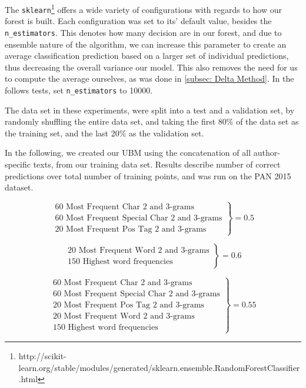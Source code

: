 The \texttt{sklearn}\footnote{http://scikit-learn.org/stable/modules/generated/sklearn.ensemble.RandomForestClassifier.html} offers a wide variety of configurations with regards to how our forest is built. Each configuration was set to its' default value, besides the \texttt{n\_estimators}. This denotes how many decision are in our forest, and due to ensemble nature of the algorithm, we can increase this parameter to create an average classification prediction based on a larger set of individual predictions, thus decreasing the overall variance our model. This also removes the need for us to compute the average ourselves, as was done in \ref{subsec: Delta Method}. In the follows tests, set \texttt{n\_estimators} to 10000.

The data set in these experiments, were split into a test and a validation set, by randomly shuffling the entire data set, and taking the first 80\% of the data set as the training set, and the last 20\% as the validation set.

In the following, we created our \gls{UBM} using the concatenation of all author-specific texts, from our training data set. Results describe number of correct predictions over total number of training points, and was run on the PAN 2015 dataset. 

$$
\left.
                \begin{array}{ll}
                  \text{60 Most Frequent Char 2 and 3-grams}\\
                  \text{60 Most Frequent Special Char 2 and 3-grams}\\
                  \text{20 Most Frequent Pos Tag 2 and 3-grams}
                \end{array}
              \right\rbrace = 0.5
$$

$$
\left.
                \begin{array}{ll}
                  \text{20 Most Frequent Word 2 and 3-grams}\\
                  \text{150 Highest word frequencies}
                \end{array}
              \right\rbrace = 0.6
$$

$$
\left.
                \begin{array}{ll}
                  \text{60 Most Frequent Char 2 and 3-grams}\\
                  \text{60 Most Frequent Special Char 2 and 3-grams}\\
                  \text{20 Most Frequent Pos Tag 2 and 3-grams}\\
                  \text{20 Most Frequent Word 2 and 3-grams}\\
                  \text{150 Highest word frequencies}
                \end{array}
              \right\rbrace = 0.55
$$

